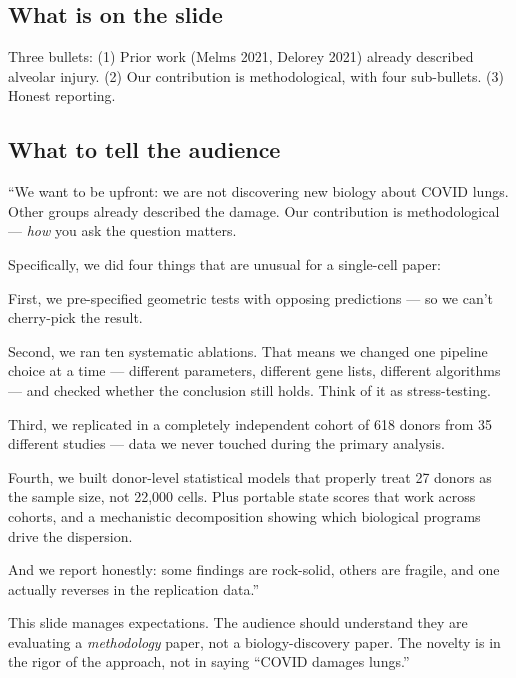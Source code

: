 \documentclass[11pt]{article}
\begin{document}
\subsection{What is on the slide}

Three bullets: (1) Prior work (Melms 2021, Delorey 2021) already described alveolar injury. (2) Our contribution is methodological, with four sub-bullets. (3) Honest reporting.

\subsection{What to tell the audience}

\begin{speaknote}
``We want to be upfront: we are not discovering new biology about COVID lungs. Other groups already described the damage. Our contribution is methodological --- \emph{how} you ask the question matters.

Specifically, we did four things that are unusual for a single-cell paper:

First, we pre-specified geometric tests with opposing predictions --- so we can't cherry-pick the result.

Second, we ran ten systematic ablations. That means we changed one pipeline choice at a time --- different parameters, different gene lists, different algorithms --- and checked whether the conclusion still holds. Think of it as stress-testing.

Third, we replicated in a completely independent cohort of 618 donors from 35 different studies --- data we never touched during the primary analysis.

Fourth, we built donor-level statistical models that properly treat 27 donors as the sample size, not 22,000 cells. Plus portable state scores that work across cohorts, and a mechanistic decomposition showing which biological programs drive the dispersion.

And we report honestly: some findings are rock-solid, others are fragile, and one actually reverses in the replication data.''
\end{speaknote}

\begin{whyblock}
This slide manages expectations. The audience should understand they are evaluating a \emph{methodology} paper, not a biology-discovery paper. The novelty is in the rigor of the approach, not in saying ``COVID damages lungs.''
\end{whyblock}
\end{document}
